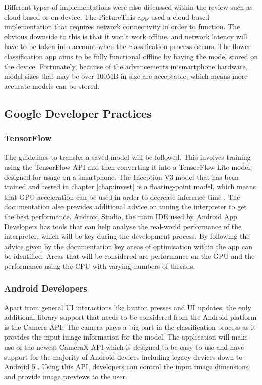 \documentclass[12pt,a4paper]{report}
\begin{document}
Different types of implementations were also discussed within the review such as cloud-based or on-device. 
The PictureThis app used a cloud-based implementation that requires network connectivity in order to function. 
The obvious downside to this is that it won't work offline, and network latency will have to be taken into account when 
the classification process occurs. The flower classification app aims to be fully functional offline by having the model
stored on the device. Fortunately, because of the advancements in smartphone hardware, model sizes that may be over 100MB 
in size are acceptable, which means more accurate models can be stored.

\subsection{Google Developer Practices}

\subsubsection{TensorFlow}

The guidelines to transfer a saved model will be followed. This involves training using the TensorFlow API and then
converting it into a TensorFlow Lite model, 
designed for usage on a smartphone. The Inception V3 model that has been trained and tested in chapter \ref{chap:invest}
is a 
floating-point model, which means that GPU acceleration can be used in order to decrease inference time 
\citep{TFGPU}. The documentation also provides additional advice on tuning the interpreter to get the best 
performance. Android Studio, the main IDE used by Android App Developers has tools that can help analyse the 
real-world performance of the interpreter, which will be key during the development process. By following the advice 
given by the documentation key areas of optimisation within the app can be identified. 
Areas that will be considered are performance on the GPU and the performance using the CPU with varying numbers of threads.

\subsubsection{Android Developers}

Apart from general UI interactions like button presses and UI updates, the only additional library support that needs to 
be considered from the Android platform is the Camera API. The camera plays a big part in the classification process as it 
provides the input image information for the model. The application will make use of the newest CameraX API which is 
designed to be easy to use and have support for the majority of Android devices including legacy devices down to Android 5 
\citep{ADCameraX}. Using this API, developers can control the input image dimensions and provide image previews to the 
user.
\end{document}
